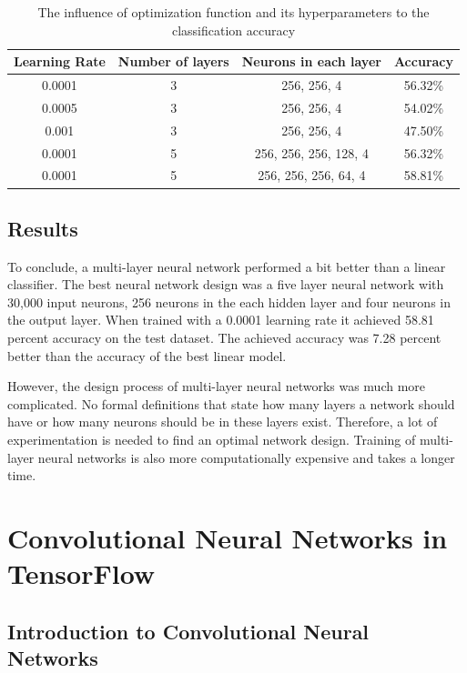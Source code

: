 \begin{table}[h]
\begin{center}
\begin{tabular}{ |c|c|c|c| }
\hline
 Learning Rate &   Number of layers &  Neurons in each layer& Accuracy \\   \hline
0.0001    &   3  &  256, 256, 4  & 56.32\% \\
0.0005    &   3  &  256, 256, 4  & 54.02\% \\
0.001    &   3  &  256, 256, 4  & 47.50\% \\
0.0001    &   5  &  256, 256, 256, 128, 4  & 56.32\% \\
0.0001    &   5  &  256, 256, 256, 64, 4 & 58.81\% \\  
 \hline
\end{tabular}
\caption{The influence of optimization function and its hyperparameters to the classification accuracy}
\label{table:multi}
\end{center}
\end{table}

\subsection{Results}

To conclude, a multi-layer neural network performed a bit better than a linear classifier. The best neural network design was a five layer neural network with 30,000 input neurons, 256 neurons in the each hidden layer and four neurons in the output layer. When trained with a 0.0001 learning rate it achieved 58.81 percent accuracy on the test dataset. The achieved accuracy was  7.28 percent better than the accuracy of the best linear model. 

However, the design process of multi-layer neural networks was much more complicated. No formal definitions that state how many layers a network should have or how many neurons should be in these layers exist. Therefore, a lot of experimentation is needed to find an optimal network design. Training of multi-layer neural networks is also more computationally expensive and takes a longer time.

\section{Convolutional Neural Networks in TensorFlow}

\subsection{Introduction to Convolutional Neural Networks }

